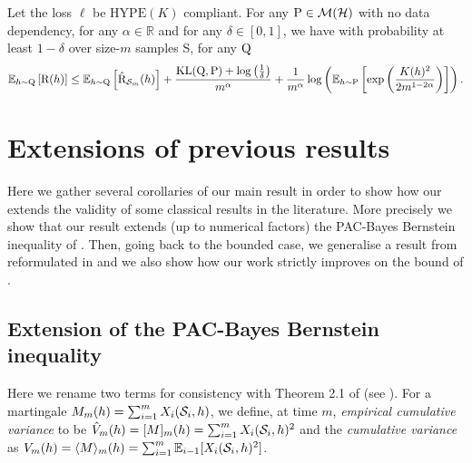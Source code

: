 \begin{theorem}
\label{th: haddouche_thm}
Let the loss $\ell$ be $\mathrm{HYPE}(K)$ compliant. For any $\P\in\mathcal{M}(\mathcal{H})$ with no data dependency, for any $\alpha\in\mathbb{R}$ and for any $\delta\in[0,1]$, we have with probability at least $1-\delta$ over size-$m$ samples S,
for any $\Q$%
\begin{align*}
\mathbb{E}_{h\sim \Q}\left[ \Risk(h)\right]
\leq \mathbb{E}_{h\sim \Q}\left[ \Riskhat_{\Sm}(h)\right] + \frac{\operatorname{KL}(\Q,\P) + \log\left(\frac{1}{\delta}\right)}{m^{\alpha}}
+\frac{1}{m^{\alpha}}\log\left(\mathbb{E}_{h\sim \P} \left[\exp\left( \frac{K(h)^2}{2m^{1-2\alpha}} \right) \right]\right).
\end{align*}
\end{theorem}


\section{Extensions of previous results}
\label{sec: extensions}

Here we gather several corollaries of our main result in order to show how our  extends the validity of some classical results in the literature. More precisely we show that our result extends (up to numerical factors) the PAC-Bayes Bernstein inequality of \citet{seldin2012bandit}.
Then, going back to the bounded case, we generalise a result from \citet{catoni2007pac} reformulated in \citet{alquier2016properties} and we also show how our work strictly improves on the bound of \citet{haddouche2021pac}.

\subsection{Extension of the PAC-Bayes Bernstein inequality}
\label{subsec: comparison_seldin}

Here we rename two terms for consistency with Theorem 2.1 of \citet{seldin2012bandit} (see ). For a martingale $M_m(h)= \sum_{i=1}^m X_i(\S_i,h)$, we define, at time $m$, \emph{empirical cumulative variance } to be $\hat{V}_m(h)= [M]_m(h) = \sum_{i=1}^m X_i(\S_i,h)^2$ and
the \emph{cumulative variance} as $V_m(h)= \langle M\rangle_m(h) = \sum_{i=1}^m \mathbb{E}_{i-1}[X_i(\S_i,h)^2]$.

